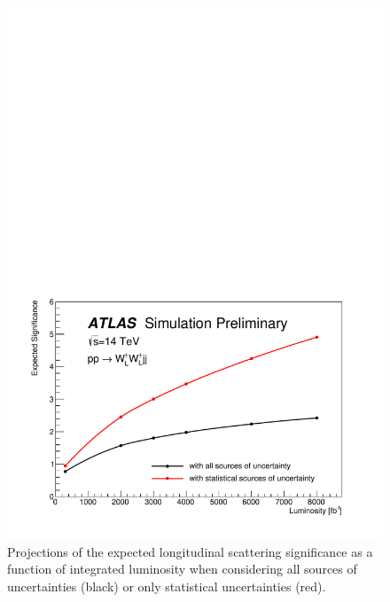 \begin{figure}[htbp]
  \centering
  \includegraphics[width=.8\textwidth]{figs/ssww_upgrade/results/LLsignificance_projection}
  \caption{Projections of the expected longitudinal scattering significance as a function of integrated luminosity when considering all sources of uncertainties (black) or only statistical uncertainties (red).}
  \label{fig:sswwupgrade_LL_significance_projection}
\end{figure}
